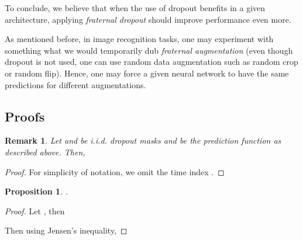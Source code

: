 \documentclass{article} \usepackage{iclr2018_conference,times}
\newtheorem{remark}{Remark}
\newtheorem{proposition}{Proposition}
\begin{document}
To conclude, we believe that when the use of dropout benefits in a given architecture, applying \emph{fraternal dropout} should improve performance even more.

As mentioned before, in image recognition tasks, one may experiment with something what we would temporarily dub \emph{fraternal augmentation} (even though dropout is not used, one can use random data augmentation such as random crop or random flip). Hence, one may force a given neural network to have the same predictions for different augmentations.

\newpage
\subsection*{Proofs}
\setcounter{remark}{0}
\setcounter{proposition}{0}

\begin{remark}
Let  and  be i.i.d. dropout masks and  be the prediction function as described above. Then, 

\end{remark}
\begin{proof}
For simplicity of notation, we omit the time index .

\end{proof}

\begin{proposition}
.
\end{proposition}
\begin{proof}
Let , then

Then using Jensen's inequality,

\end{proof}
\end{document}

